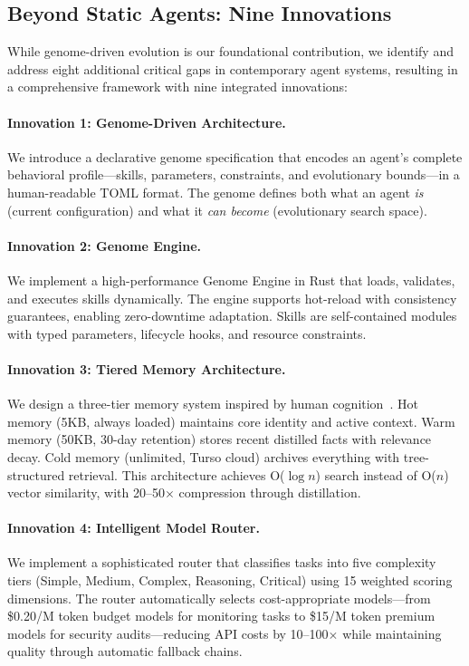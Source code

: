 \documentclass{article}
\begin{document}
\subsection{Beyond Static Agents: Nine Innovations}

While genome-driven evolution is our foundational contribution, we identify and address eight additional critical gaps in contemporary agent systems, resulting in a comprehensive framework with nine integrated innovations:

\paragraph{Innovation 1: Genome-Driven Architecture.} We introduce a declarative genome specification that encodes an agent's complete behavioral profile—skills, parameters, constraints, and evolutionary bounds—in a human-readable TOML format. The genome defines both what an agent \textit{is} (current configuration) and what it \textit{can become} (evolutionary search space).

\paragraph{Innovation 2: Genome Engine.} We implement a high-performance Genome Engine in Rust that loads, validates, and executes skills dynamically. The engine supports hot-reload with consistency guarantees, enabling zero-downtime adaptation. Skills are self-contained modules with typed parameters, lifecycle hooks, and resource constraints.

\paragraph{Innovation 3: Tiered Memory Architecture.} We design a three-tier memory system inspired by human cognition~\cite{atkinson1971human}. Hot memory (5KB, always loaded) maintains core identity and active context. Warm memory (50KB, 30-day retention) stores recent distilled facts with relevance decay. Cold memory (unlimited, Turso cloud) archives everything with tree-structured retrieval. This architecture achieves O($\log n$) search instead of O($n$) vector similarity, with 20--50$\times$ compression through distillation.

\paragraph{Innovation 4: Intelligent Model Router.} We implement a sophisticated router that classifies tasks into five complexity tiers (Simple, Medium, Complex, Reasoning, Critical) using 15 weighted scoring dimensions. The router automatically selects cost-appropriate models—from \$0.20/M token budget models for monitoring tasks to \$15/M token premium models for security audits—reducing API costs by 10--100$\times$ while maintaining quality through automatic fallback chains.
\end{document}
